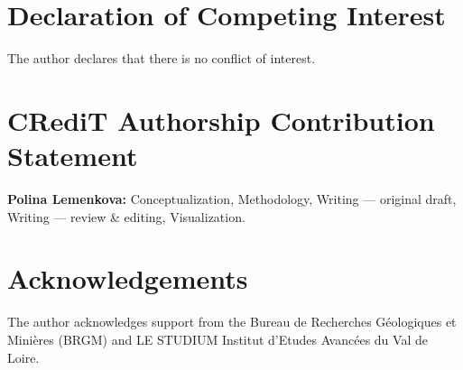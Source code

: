 \documentclass[preprint,12pt]{elsarticle}            %
\begin{document}
\section*{Declaration of Competing Interest}
The author declares that there is no conflict of interest.

\section*{CRediT Authorship Contribution Statement}
\textbf{Polina Lemenkova:} Conceptualization, Methodology, Writing ---
original draft, Writing --- review \& editing, Visualization.

\section*{Acknowledgements}
The author acknowledges support from the Bureau de Recherches G\'eologiques
et Mini\`eres (BRGM) and LE STUDIUM Institut d'Etudes Avanc\'ees du Val de
Loire.



\end{document}
